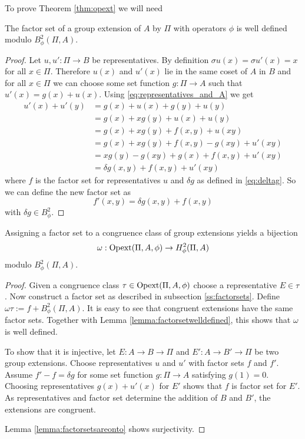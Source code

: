 To prove Theorem \eqref{thm:opext} we will need
\begin{lemma}
\label{lemma:factorsetwelldefined}
The factor set of a group extension of $A$ by $\Pi$ with operators $\phi$ is well defined modulo $B_\phi^2(\Pi,A)$.
\end{lemma}
\begin{proof}
Let $u,u':\Pi\to B$ be representatives.
By definition $\sigma u (x)= \sigma u' (x) = x$ for all $x\in\Pi$.
Therefore $u(x)$ and $u'(x)$ lie in the same coset of $A$ in $B$ and for all $x\in\Pi$ we can choose some set function
$g: \Pi \to A$ such that
$u'(x) = g(x) + u(x)$.
Using \eqref{eq:representatives_and_A} we get
\begin{align*}
u'(x) + u'(y) 
&= g(x)+u(x)+g(y)+u(y) \\
&= g(x)+xg(y)+u(x)+u(y) \\
&= g(x)+xg(y)+f(x,y)+u(xy) \\  
&= g(x)+xg(y)+f(x,y)-g(xy)+u'(xy) \\
&= xg(y)-g(xy)+g(x)+f(x,y)+u'(xy) \\
&= \delta g (x,y) +f(x,y)+u'(xy)
\end{align*}
where $f$ is the factor set for representatives $u$ and $\delta g$ as defined in \eqref{eq:deltag}.
So we can define the new factor set as
\[
f'(x,y) = \delta g (x,y) +f(x,y)
\]
with $\delta g\in B_\phi^2$.
\end{proof}
\begin{theorem}
\label{thm:opext}
Assigning a factor set to a congruence class of group extensions yields a bijection
\[\omega: \operatorname{Opext}(\Pi,A,\phi) \to H^2_\phi(\Pi,A)\]
modulo $B^2_\phi(\Pi,A)$.
\end{theorem}
\begin{proof}
Given a congruence class $\tau\in \operatorname{Opext}(\Pi,A,\phi)$ choose a representative $E\in \tau$.
Now construct a factor set as described in subsection \ref{ss:factorsets}.
Define $\omega \tau := f+B^2_\phi(\Pi,A)$.
It is easy to see that congruent extensions have the same factor sets.
Together with Lemma \ref{lemma:factorsetwelldefined}, this shows that $\omega$ is well defined.

To show that it is injective, let $E:A\to B \to \Pi$ and $E':A\to B' \to \Pi$ be two group extensions.
Choose representatives $u$ and $u'$ with factor sets $f$ and $f'$.
Assume $f' - f = \delta g$ for some set function $g: \Pi \to A$ satisfying $g(1)=0$.
Choosing representatives $g(x) + u'(x)$ for $E'$ shows that $f$ is factor set for $E'$.
As representatives and factor set determine the addition of $B$ and $B'$, the extensions are congruent.

Lemma \ref{lemma:factorsetsareonto} shows surjectivity.
\end{proof}
